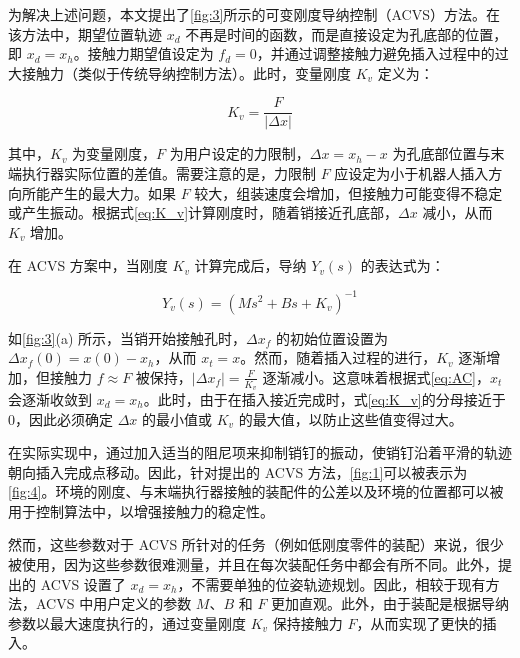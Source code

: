 \documentclass{Diploma}
\begin{document}
为解决上述问题，本文提出了\ref{fig:3}所示的可变刚度导纳控制（ACVS）方法。在该方法中，期望位置轨迹 $x_d$ 不再是时间的函数，而是直接设定为孔底部的位置，即 $x_d = x_h$。接触力期望值设定为 $f_d = 0$，并通过调整接触力避免插入过程中的过大接触力（类似于传统导纳控制方法）。此时，变量刚度 $K_v$ 定义为：

%

\begin{equation} \label{eq:K_v}
K_v = \frac{F}{|\Delta x|}
\end{equation}

其中，$K_v$ 为变量刚度，$F$ 为用户设定的力限制，$\Delta x = x_h - x$ 为孔底部位置与末端执行器实际位置的差值。需要注意的是，力限制 $F$ 应设定为小于机器人插入方向所能产生的最大力。如果 $F$ 较大，组装速度会增加，但接触力可能变得不稳定或产生振动。根据式\eqref{eq:K_v}计算刚度时，随着销接近孔底部，$\Delta x$ 减小，从而 $K_v$ 增加。

在 ACVS 方案中，当刚度 $K_v$ 计算完成后，导纳 $Y_v(s)$ 的表达式为：

\begin{equation} \label{eq:Y_v}
Y_v(s) = \left(Ms^2 + Bs + K_v \right)^{-1}
\end{equation}

如\ref{fig:3}(a) 所示，当销开始接触孔时，$\Delta x_f$ 的初始位置设置为 $\Delta x_f(0) = x(0) - x_h$，从而 $x_t = x$。然而，随着插入过程的进行，$K_v$ 逐渐增加，但接触力 $f \approx F$ 被保持，$|\Delta x_f| = \frac{F}{K_v}$ 逐渐减小。这意味着根据式\eqref{eq:AC}，$x_t$ 会逐渐收敛到 $x_d = x_h$。此时，由于在插入接近完成时，式\eqref{eq:K_v}的分母接近于 0，因此必须确定 $\Delta x$ 的最小值或 $K_v$ 的最大值，以防止这些值变得过大。

在实际实现中，通过加入适当的阻尼项来抑制销钉的振动，使销钉沿着平滑的轨迹朝向插入完成点移动。因此，针对提出的 ACVS 方法，\ref{fig:1}可以被表示为\ref{fig:4}。环境的刚度、与末端执行器接触的装配件的公差以及环境的位置都可以被用于控制算法中，以增强接触力的稳定性。

%

然而，这些参数对于 ACVS 所针对的任务（例如低刚度零件的装配）来说，很少被使用，因为这些参数很难测量，并且在每次装配任务中都会有所不同。此外，提出的 ACVS 设置了 $x_d = x_h$，不需要单独的位姿轨迹规划。因此，相较于现有方法，ACVS 中用户定义的参数 $M$、$B$ 和 $F$ 更加直观。此外，由于装配是根据导纳参数以最大速度执行的，通过变量刚度 $K_v$ 保持接触力 $F$，从而实现了更快的插入。
\end{document}
